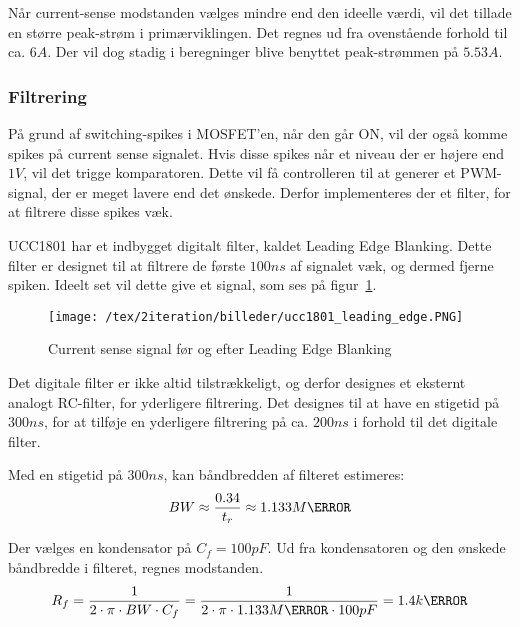 Når current-sense modstanden vælges mindre end den ideelle værdi, vil det tillade en større peak-strøm i primærviklingen. Det regnes ud fra ovenstående forhold til ca. $6A$. Der vil dog stadig i beregninger blive benyttet peak-strømmen på $5.53A$.



\subsubsection{Filtrering}
\noindent På grund af switching-spikes i MOSFET'en, når den går ON, vil der også komme spikes på current sense signalet. Hvis disse spikes når et niveau der er højere end $1V$, vil det trigge komparatoren. Dette vil få controlleren til at generer et PWM-signal, der er meget lavere end det ønskede. Derfor implementeres der et filter, for at filtrere disse spikes væk.

UCC1801 har et indbygget digitalt filter, kaldet Leading Edge Blanking. Dette filter er designet til at filtrere de første $100ns$ af signalet væk, og dermed fjerne spiken. Ideelt set vil dette give et signal, som ses på figur~\ref{fig:ucc1801_leading_edge}.

\begin{figure}[H]
	\center
	\texttt{[image: /tex/2iteration/billeder/ucc1801\_leading\_edge.PNG]}
	\caption{Current sense signal før og efter Leading Edge Blanking}
	\label{fig:ucc1801_leading_edge}
\end{figure}

\noindent Det digitale filter er ikke altid tilstrækkeligt, og derfor designes et eksternt analogt RC-filter, for yderligere filtrering. Det designes til at have en stigetid på $300ns$, for at tilføje en yderligere filtrering på ca. $200ns$ i forhold til det digitale filter. 

\noindent Med en stigetid på $300ns$, kan båndbredden af filteret estimeres\cite{risetime}:
\begin{equation} \label{filter_BW}
BW \approx \frac{0.34}{t_r} \approx 1.133M\hertz
\end{equation} 

\noindent Der vælges en kondensator på $C_f=100pF$. Ud fra kondensatoren og den ønskede båndbredde i filteret, regnes modstanden.
\begin{equation} \label{filter_R}
R_f = \frac{1}{2 \cdot \pi \cdot BW \cdot C_f} = \frac{1}{2 \cdot \pi \cdot 1.133M\hertz \cdot 100pF} = 1.4k\ohm
\end{equation}

